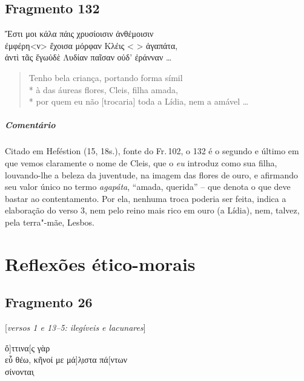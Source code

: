 {\pagebreak
\section{Fragmento 132}

\begin{gkverse}
Ἔστι μοι κάλα πάις χρυσίοισιν ἀνθέμοισιν\\
ἐμφέρη<ν> ἔχοισα μόρφαν Κλέις <  > ἀγαπάτα,\\
ἀντὶ τᾶς ἔγωὐδὲ Λυδίαν παῖσαν οὐδ’ ἐράνναν \ldots{}
\end{gkverse}

\begin{verse}
Tenho bela criança, portando forma símil\\*
à das áureas flores, Cleis, filha amada,\\*
por quem eu não [trocaria] toda a Lídia, nem a amável \ldots{}
\end{verse}

\medskip

{\paragraph{Comentário} Citado em Heféstion (15, 18s.), fonte do Fr.\,102, o 132 é o segundo e último em que vemos claramente o nome de Cleis, que o \textit{eu} introduz como sua filha, louvando-lhe a
beleza da juventude, na imagem das flores de ouro, e afirmando seu valor único no termo \textit{agapáta}, ``amada, querida'' -- que denota o que deve bastar ao contentamento. Por ela, nenhuma troca poderia ser feita, indica a elaboração do verso 3, nem pelo reino mais rico em ouro (a Lídia), nem, talvez, pela terra"-mãe, Lesbos.}



\chapter{Reflexões ético-morais}

\section{Fragmento 26} 

\begin{gkverse}
\textnormal{[\textit{versos 1 e 13--5: ilegíveis e lacunares}]}

ὄ]ττινα[ς γὰρ\\
εὖ θέω, κῆνοί με μά]λ̣ιστα πά[ντων\\
σίνονται̣


\end{gkverse}}
